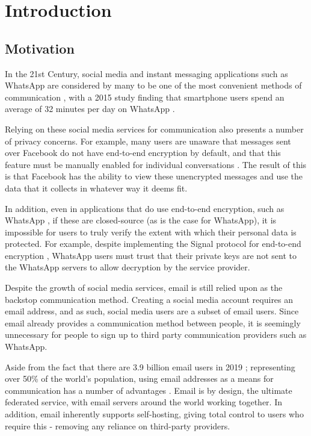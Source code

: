 \chapter{Introduction}


\section{Motivation}

In the 21st Century, social media and instant messaging applications such as WhatsApp are considered by many to be one of the most convenient methods of communication \cite{church2013}, with a 2015 study finding that smartphone users spend an average of 32 minutes per day on WhatsApp \cite{montag2015}. 

Relying on these social media services for communication also presents a number of privacy concerns. For example, many users are unaware that messages sent over Facebook do not have end-to-end encryption by default, and that this feature must be manually enabled for individual conversations \cite{facebook2017}. The result of this is that Facebook has the ability to view these unencrypted messages and use the data that it collects in whatever way it deems fit. 

In addition, even in applications that do use end-to-end encryption, such as WhatsApp \cite{whatsapp2017}, if these are closed-source (as is the case for WhatsApp), it is impossible for users to truly verify the extent with which their personal data is protected. For example, despite implementing the Signal protocol for end-to-end encryption \cite{whatsapp2017}, WhatsApp users must trust that their private keys are not sent to the WhatsApp servers to allow decryption by the service provider.

Despite the growth of social media services, email is still relied upon as the backstop communication method. Creating a social media account requires an email address, and as such, social media users are a subset of email users. Since email already provides a communication method between people, it is seemingly unnecessary for people to sign up to third party communication providers such as WhatsApp.

Aside from the fact that there are 3.9 billion email users in 2019 \cite{radicati2019}; representing over 50\% of the world's population, using email addresses as a means for communication has a number of advantages \cite{hanson2011}. Email is by design, the ultimate federated service, with email servers around the world working together. In addition, email inherently supports self-hosting, giving total control to users who require this - removing any reliance on third-party providers.

